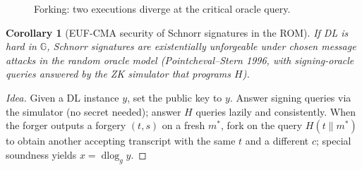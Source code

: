 \documentclass[11pt,a4paper]{report}
\theoremstyle{plain}
\newtheorem{corollary}[theorem]{Corollary}
\theoremstyle{definition}
\theoremstyle{remark}
\newcommand{\GG}{\mathbb{G}}
\DeclareMathOperator{\dlog}{dlog}
\begin{document}
\begin{figure}[h]
\centering
{}
\caption{Forking: two executions diverge at the critical oracle query.}
\end{figure}
\begin{corollary}[EUF-CMA security of Schnorr signatures in the ROM]
If DL is hard in $\GG$, Schnorr signatures are existentially unforgeable under chosen message attacks in the random oracle model (Pointcheval--Stern 1996, with signing-oracle queries answered by the ZK simulator that programs $H$).
\end{corollary}
\begin{proof}[Idea]
Given a DL instance $y$, set the public key to $y$. Answer signing queries via the simulator (no secret needed); answer $H$ queries lazily and consistently. When the forger outputs a forgery $(t,s)$ on a fresh $m^*$, fork on the query $H(t\|m^*)$ to obtain another accepting transcript with the same $t$ and a different $c$; special soundness yields $x=\dlog_gy$.
\end{proof}
\end{document}
